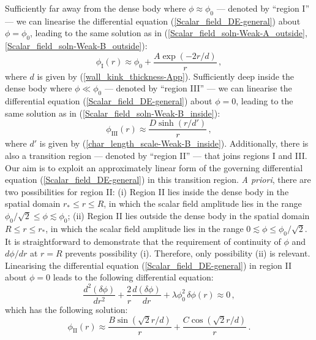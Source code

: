 \documentclass[aps,prd,onecolumn,nofootinbib]{revtex4-2} %
\begin{document}
Sufficiently far away from the dense body where $\phi \approx \phi_0$ --- denoted by ``region I'' --- we can linearise the differential equation (\ref{Scalar_field_DE-general}) about $\phi = \phi_0$, leading to the same solution as in (\ref{Scalar_field_soln-Weak-A_outside},\ref{Scalar_field_soln-Weak-B_outside}): 
\begin{equation}
\label{Scalar_field_soln-Strong_region-I}
\phi_\textrm{I} (r) \approx \phi_0 + \frac{A \exp \left( -2r / d \right)}{r}  \, , 
\end{equation}
where $d$ is given by (\ref{wall_kink_thickness-App}). 
Sufficiently deep inside the dense body where $\phi \ll \phi_0$ --- denoted by ``region III'' --- we can linearise the differential equation (\ref{Scalar_field_DE-general}) about $\phi = 0$, leading to the same solution as in (\ref{Scalar_field_soln-Weak-B_inside}): 
\begin{equation}
\label{Scalar_field_soln-Strong_region-III}
\phi_\textrm{III} (r) \approx \frac{D \sinh \left( r / d' \right)}{r}  \, , 
\end{equation}
where $d'$ is given by (\ref{char_length_scale-Weak-B_inside}). 
Additionally, there is also a transition region --- denoted by ``region II'' --- that joins regions I and III. 
Our aim is to exploit an approximately linear form of the governing differential equation (\ref{Scalar_field_DE-general}) in this transition region. 
\textit{A priori}, there are two possibilities for region II: 
(i) Region II lies inside the dense body in the spatial domain $r_* \le r \le R$, in which the scalar field amplitude lies in the range $\phi_0/\sqrt{2} \le \phi \lesssim \phi_0$; 
(ii) Region II lies outside the dense body in the spatial domain $R \le r \le r_*$, in which the scalar field amplitude lies in the range $0 \lesssim \phi \le \phi_0/\sqrt{2}$. 
It is straightforward to demonstrate that the requirement of continuity of $\phi$ and $d\phi/dr$ at $r = R$ prevents possibility (i). 
Therefore, only possibility (ii) is relevant. 
Linearising the differential equation (\ref{Scalar_field_DE-general}) in region II about $\phi = 0$ leads to the following differential equation: 
\begin{equation}
\label{Scalar_field_DE-Strong_region-II}
\frac{d^2 (\delta \phi)}{d r^2} + \frac{2}{r} \frac{d (\delta \phi)}{d r} + \lambda \phi_0^2 \, \delta \phi (r) \approx 0  \, , 
\end{equation}
which has the following solution: 
\begin{equation}
\label{Scalar_field_soln-Strong_region-II}
\phi_\textrm{II} (r) \approx \frac{B \sin \left( \sqrt{2} r / d \right)}{r} + \frac{C \cos \left( \sqrt{2} r / d \right)}{r}  \, . 
\end{equation}
\end{document}
